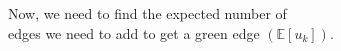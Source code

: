 \documentclass[preview]{standalone}
\begin{document}
\begin{center}
Now, we need to find the expected number of \\edges we need to add to get a green edge $(\mathbb{E}[u_k])$.
\end{center}
\end{document}
